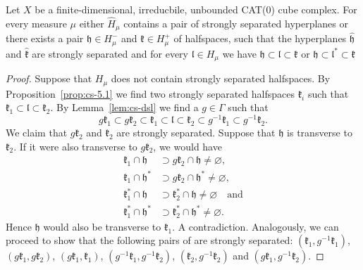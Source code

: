 \begin{lemma}[{\cite[Lemma~4.19]{MR3509968}}]
  \label{lem:4.19}
  Let \(X\) be a finite-dimensional, irreducbile, unbounded CAT(0) cube complex. For every measure \(\mu\) either \(\hat H_\mu\) contains a pair of strongly separated hyperplanes or there exists a pair \(\mathfrak{h} \in H_\mu^-\) and \(\mathfrak{k} \in H_\mu^+\) of halfspaces, such that the hyperplanes \(\mathfrak{\hat h}\) and \(\mathfrak{\hat k}\) are strongly separated and for every \(\mathfrak{l} \in H_\mu\) we have  \(\mathfrak{h} \subset \mathfrak{l} \subset  \mathfrak{k}\) or \(\mathfrak{h} \subset \mathfrak{l}^\ast \subset \mathfrak{k}\)
\end{lemma}

\begin{proof}
  Suppose that \(H_\mu\) does not contain strongly separated halfspaces. By Proposition~\ref{prop:cs-5.1} we find two strongly separated halfspaces \(\mathfrak{k}_i\) such that \(\mathfrak{k}_1 \subset \mathfrak{l} \subset \mathfrak{k}_2\). By Lemma~\ref{lem:cs-dsl} we find a \(g \in \Gamma\) such that
  \[
    g\mathfrak{k}_1 \subset g\mathfrak{k}_2 \subset \mathfrak{k}_1 \subset \mathfrak{l} \subset \mathfrak{k}_2 \subset g^{-1}\mathfrak{k}_1 \subset g^{-1} \mathfrak{k}_2.
  \]
  We claim that \(g\mathfrak{k}_2\) and \(\mathfrak{k}_2\) are strongly separated. Suppose that \(\mathfrak{h}\) is transverse to \(\mathfrak{k}_2\). If it were also transverse to \(g \mathfrak{k}_2\), we would have
  \begin{align*}
    \mathfrak{k}_1 \cap \mathfrak{h} &\supset g\mathfrak{k}_2 \cap \mathfrak{h} \neq \varnothing,\\
    \mathfrak{k}_1 \cap \mathfrak{h}^\ast &\supset g\mathfrak{k}_2 \cap \mathfrak{h}^\ast \neq \varnothing,\\
    \mathfrak{k}_1^\ast \cap \mathfrak{h} &\supset \mathfrak{k}_2^\ast \cap \mathfrak{h} \neq \varnothing \quad \text{and}\\
    \mathfrak{k}_1^\ast \cap \mathfrak{h}^\ast &\supset \mathfrak{k}_2^\ast \cap \mathfrak{h}^\ast \neq \varnothing.
  \end{align*}
  Hence \(\mathfrak{h}\) would also be transverse to \(\mathfrak{k}_1\). A contradiction. Analogously, we can proceed to show that the following pairs of are strongly separated:  \((\mathfrak{k}_1,g^{-1}\mathfrak{k}_1)\), \((g\mathfrak{k}_1, g\mathfrak{k}_2)\), \((g\mathfrak{k}_1, \mathfrak{k}_1)\), \((g^{-1}\mathfrak{k}_1, g^{-1}\mathfrak{k}_2)\), \((\mathfrak{k}_2,g^{-1}\mathfrak{k}_2)\) and \((g\mathfrak{k}_1, g^{-1}\mathfrak{k}_2)\).


\end{proof}
